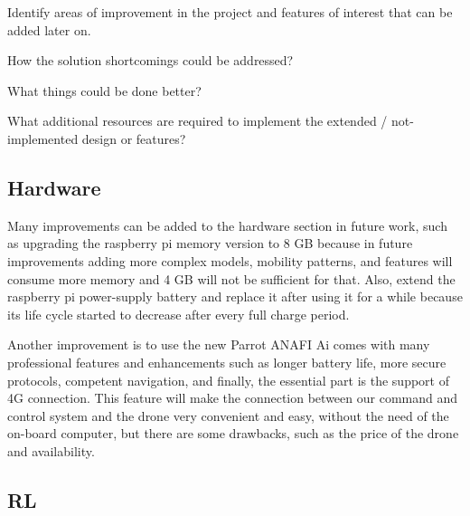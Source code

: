 \documentclass[../main.tex]{subfiles}
\begin{document}
\begin{newrequirements}
    \begin{todolist}
    \item Identify areas of improvement in the 
        project and features of interest that 
        can be added later on. 

    \item How the solution shortcomings could be 
        addressed? 

    \item What things could be done better? 

    \item What additional resources are required 
        to implement the extended / not-
        implemented design or features?

    \end{todolist}
\end{newrequirements}

\subsection{Hardware}
Many improvements can be added to the hardware section in future work,
such as upgrading the raspberry pi memory version to 8 GB because in future improvements
adding more complex models, mobility patterns, and features will consume more memory 
and 4 GB will not be sufficient for that.
Also, extend the raspberry pi power-supply battery and replace it after
using it for a while because its life cycle started to decrease after every full charge period. 

Another improvement is to use the new Parrot
ANAFI Ai comes with many professional features and enhancements such as longer 
battery life, 
more secure protocols, competent navigation, and finally, the essential part is the 
support of 4G connection.
This feature will make the connection between our command and control system and the
drone very convenient and easy, without the need of the on-board computer, 
but there are some drawbacks, such as the price of the drone and availability.




 

\subsection{RL}
\end{document}
